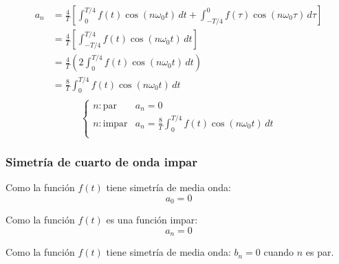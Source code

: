 \begin{equation*}
\begin{split}
    a_n
        &=\frac{4}{T}\left[
            \int_0^{T/4} f(t)\cos(n\omega_0 t)\,dt+
            \int_{-T/4}^0 f(\tau)\cos(n\omega_0\tau)\,d\tau
        \right]\\
        &=\frac{4}{T}\left[\int_{-T/4}^{T/4} f(t)\cos(n\omega_0 t)\,dt\right]\\
        &=\frac{4}{T}\left(2\int_0^{T/4} f(t)\cos(n\omega_0 t)\,dt\right)\\
        &=\frac{8}{T}\int_0^{T/4} f(t)\cos(n\omega_0 t)\,dt\\
\end{split}
\end{equation*}
\begin{equation}
\begin{cases}
    n: \text{par}   &a_n=0\\
    n: \text{impar} &a_n=\frac{8}{T}\int_0^{T/4}f(t)\cos(n\omega_0 t)\,dt\\
\end{cases}
\end{equation}

\subsubsection{Simetría de cuarto de onda impar}
Como la función $f(t)$ tiene simetría de media onda:
\begin{equation}
    a_0=0
\end{equation}

Como la función $f(t)$ es una función impar:
\begin{equation}
    a_n=0
\end{equation}

Como la función $f(t)$ tiene simetría de media onda: $b_n=0$ cuando $n$ es par.

